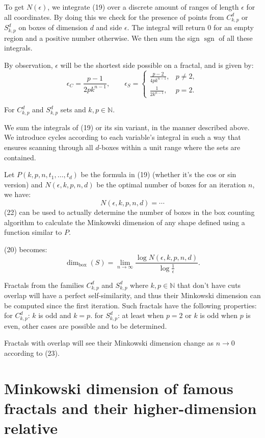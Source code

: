\documentclass[11pt]{article}
\begin{document}
To get $N(\epsilon)$, we integrate (19) over a discrete amount of ranges of length $\epsilon$ for all coordinates. By doing this we check for the presence of points from $C_{k,p}^d$ or $S_{k,p}^d$ on boxes of dimension $d$ and side $\epsilon$. The integral will return $0$ for an empty region and a positive number otherwise. We then sum the sign $\operatorname{sgn}$ of all these integrals.

By observation, $\epsilon$ will be the shortest side possible on a fractal, and is given by:
\[
\epsilon_C=\frac{p-1}{2pk^{n-1}},\qquad
\epsilon_S=
\begin{cases}
\frac{p-2}{4pk^{n-1}}, & p\neq 2,\\[4pt]
\frac{1}{2k^{n-1}}, & p=2.
\end{cases}
\]

For $C_{k,p}^d$ and $S_{k,p}^d$ sets and $k,p\in\mathbb{N}$.

We sum the integrals of (19) or its sin variant, in the manner described above. We introduce cycles according to each variable's integral in such a way that ensures scanning through all $d$-boxes within a unit range where the sets are contained.

Let $P(k,p,n,t_1,\dots,t_d)$ be the formula in (19) (whether it's the cos or sin version) and $N(\epsilon,k,p,n,d)$ be the optimal number of boxes for an iteration $n$, we have:
\[
N(\epsilon,k,p,n,d)=\cdots
\]
(22) can be used to actually determine the number of boxes in the box counting algorithm to calculate the Minkowski dimension of any shape defined using a function similar to $P$.

(20) becomes:
\[
\dim_{\mathrm{box}}(S)=\lim_{n\to\infty}\frac{\log N(\epsilon,k,p,n,d)}{\log \frac{1}{\epsilon}}.
\]

Fractals from the families $C_{k,p}^d$ and $S_{k,p}^d$ where $k,p\in\mathbb{N}$ that don't have cuts overlap will have a perfect self-similarity, and thus their Minkowski dimension can be computed since the first iteration. Such fractals have the following properties:
for $C_{k,p}^d$: $k$ is odd and $k=p$.
for $S_{k,p}^d$: at least when $p=2$ or $k$ is odd when $p$ is even, other cases are possible and to be determined.

Fractals with overlap will see their Minkowski dimension change as $n\to 0$ according to (23).

\section{Minkowski dimension of famous fractals and their higher-dimension relative}
\end{document}
